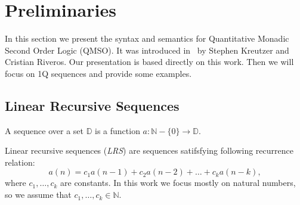 \documentclass[12pt]{article}
\newcommand{\ifilip}[1]{\todo[inline,color=green!10]{{\bf Filip:} #1}}
\theoremstyle{definition}
\begin{document}





\section{Preliminaries}
In this section we present the syntax and semantics for Quantitative Monadic Second Order Logic (QMSO). It was introduced in~\cite{KreutzerR13} by Stephen Kreutzer and Cristian Riveros. Our presentation is based directly on this work. Then we will focus on 1Q sequences and provide some examples.

\subsection{Linear Recursive Sequences}
A sequence over a set $\mathbb{D}$ is a function $a : \mathbb{N} - \{0\} \rightarrow \mathbb{D}$.

Linear recursive sequences (\emph{LRS}) are sequences satifsfying following recurrence relation:
$$a(n) = c_1 a(n-1) + c_2 a(n-2) + \ldots + c_k a(n-k),$$
where $c_1,\ldots,c_k$ are constants. In this work we focus mostly on natural numbers, so we assume that $c_1,\ldots ,c_k \in \mathbb{N}$.
\end{document}
